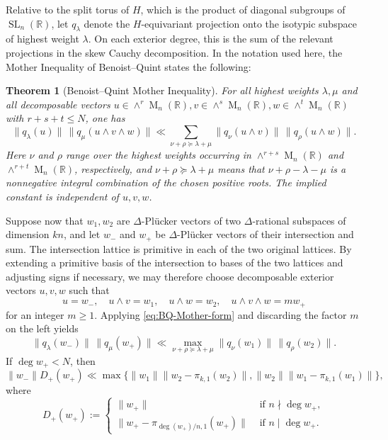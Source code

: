 \documentclass[reqno,11pt]{amsart}
\numberwithin{equation}{section}
\newtheorem{theorem}{Theorem}[section]
\theoremstyle{definition}
\theoremstyle{remark}
\newcommand{\op}{\operatorname}
\newcommand{\br}{\mathbb R}
\newcommand{\M}{\op{M}}
\newcommand{\SL}{\op{SL}}
\begin{document}
Relative to the split torus of $H$, which is
the product of diagonal subgroups of $\SL_n(\br)$, let $q_\lambda$ denote the
$H$-equivariant projection onto the isotypic subspace of  highest
weight $\lambda$. On each exterior degree, this is the sum of the relevant
projections in the skew Cauchy decomposition. In the notation used here,
the Mother Inequality of Benoist--Quint
\cite[Proposition~3.1]{benoist-quint:2012} states the following:


\begin{theorem}[Benoist--Quint Mother Inequality]
\label{thm:BQ-Mother}
For all highest weights $\lambda,\mu$ and all decomposable vectors
$u\in\wedge^r\M_n(\mathbb R), v\in\wedge^s\M_n(\mathbb R), w\in\wedge^t\M_n(\mathbb R) $
with $r+s+t\le N$, one has
\begin{equation}\label{eq:BQ-Mother-form}
\|q_\lambda(u)\|\,\|q_\mu(u\wedge v\wedge w)\|
\ll
\sum_{\nu+\rho\succeq\lambda+\mu}
\|q_\nu(u\wedge v)\|\,\|q_\rho(u\wedge w)\|.
\end{equation}
Here $\nu$ and $\rho$ range over the highest weights occurring in
$\wedge^{r+s}\M_n(\mathbb R)$ and
$\wedge^{r+t}\M_n(\mathbb R)$, respectively, and
$\nu+\rho\succeq\lambda+\mu$ means that
$\nu+\rho-\lambda-\mu$ is a nonnegative integral combination of the
chosen positive roots. The implied constant is independent of
$u,v,w$.
\end{theorem}

 Suppose now that
$w_1,w_2$ are $\Delta$-Pl\"ucker vectors of two $\Delta$-rational
subspaces of dimension $kn$, and let $w_-$ and $w_+$ be 
$\Delta$-Pl\"ucker vectors of their intersection and sum. The 
intersection lattice is primitive in each of the two original lattices. By extending a
primitive basis of the intersection to bases of the two lattices and adjusting
signs if necessary, we may therefore choose decomposable exterior vectors $u,v,w$ such
that
$$
u=w_-,\quad u\wedge v=w_1,\quad u\wedge w=w_2,\quad
u\wedge v\wedge w=mw_+
$$
for an integer $m\ge1$. Applying \eqref{eq:BQ-Mother-form} and discarding
the factor $m$ on the left yields
\begin{equation}\label{eq:BQ-specialized-form}
\|q_\lambda(w_-)\|\,\|q_\mu(w_+)\|
\ll
\max_{\nu+\rho\succeq\lambda+\mu}
\|q_\nu(w_1)\|\,\|q_\rho(w_2)\|.
\end{equation}
If $\deg w_+<N$, then
\begin{equation}\label{eq:Mother-coarse-consequence}
\|w_-\|D_+(w_+)\ll \max\{\|w_1\|\|w_2-\pi_{k,1}(w_2)\|,\|w_2\|\|w_1-\pi_{k,1}(w_1)\|\},
\end{equation}
where
$$
D_+(w_+):=
\begin{cases}
\|w_+\|& \text{ if } n\nmid\deg w_+,\\
\|w_+-\pi_{\deg(w_+)/n,1}(w_+)\|&\text{ if } n\mid\deg w_+.
\end{cases}
$$
\end{document}
